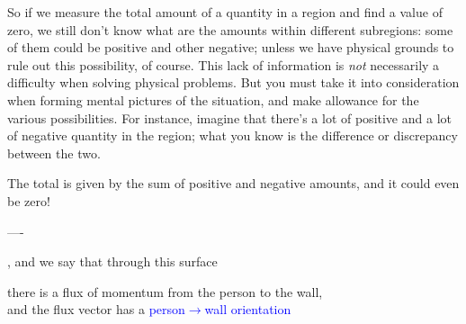 So if we measure the total amount of a quantity in a region and find a value of zero, we still don't know what are the amounts within different subregions: some of them could be positive and other negative; unless we have physical grounds to rule out this possibility, of course. This lack of information is \emph{not} necessarily a difficulty when solving physical problems. But you must take it into consideration when forming mental pictures of the situation, and make allowance for the various possibilities. For instance, imagine that there's a lot of positive and a lot of negative quantity in the region; what you know is the difference or discrepancy between the two.



The total is given by the sum of positive and negative amounts, and it could even be zero!


----



  , and we say that through this surface\noprelistbreak
\begin{center}%
  there is a flux of momentum from the person to the wall,\\
  and the flux vector has a \textcolor{blue}{person$\rightarrow$wall orientation}
\end{center}



